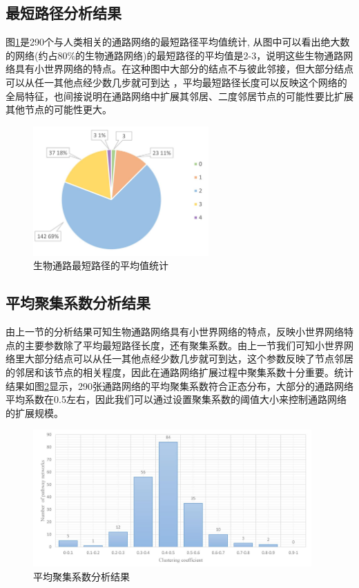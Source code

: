 \subsection{最短路径分析结果}
图\ref{fig27}是290个与人类相关的通路网络的最短路径平均值统计, 从图中可以看出绝大数的网络(约占80\%的生物通路网络)的最短路径的平均值是2-3，说明这些生物通路网络具有小世界网络\cite{amaral2000classes}的特点。在这种图中大部分的结点不与彼此邻接，但大部分结点可以从任一其他点经少数几步就可到达 ，平均最短路径长度可以反映这个网络的全局特征，也间接说明在通路网络中扩展其邻居、二度邻居节点的可能性要比扩展其他节点的可能性更大。

\begin{figure}[h]
\centering
\includegraphics[width = 0.6\textwidth]{pie}
\caption[fig27]{生物通路最短路径的平均值统计}
\label{fig27}
\end{figure}

\subsection{平均聚集系数分析结果}

由上一节的分析结果可知生物通路网络具有小世界网络的特点，反映小世界网络特点的主要参数除了平均最短路径长度，还有聚集系数。由上一节我们可知小世界网络里大部分结点可以从任一其他点经少数几步就可到达，这个参数反映了节点邻居的邻居和该节点的相关程度，因此在通路网络扩展过程中聚集系数十分重要。统计结果如图\ref{fig28}显示，290张通路网络的平均聚集系数符合正态分布，大部分的通路网络平均系数在0.5左右，因此我们可以通过设置聚集系数的阈值大小来控制通路网络的扩展规模。
\begin{figure}[h]
\centering
\includegraphics[width = 0.95\textwidth]{cc}
\caption[fig28]{平均聚集系数分析结果}
\label{fig28}
\end{figure}

